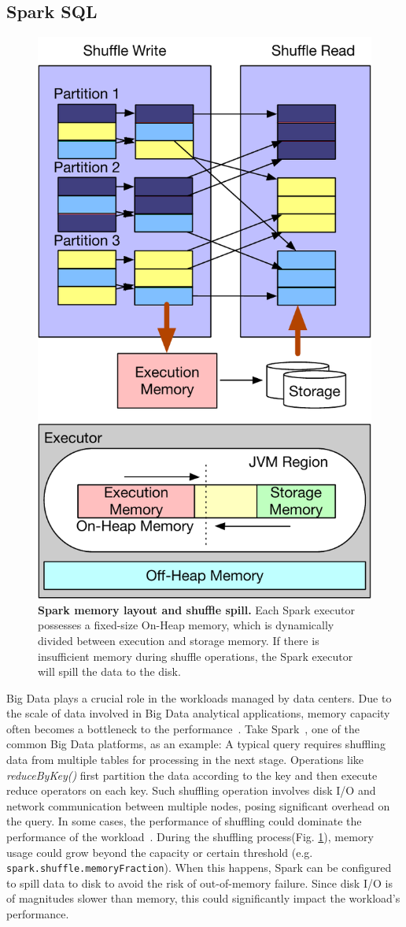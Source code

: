 \subsection{Spark SQL}
\begin{figure}[t]
\centering
 \includegraphics[width=0.5\columnwidth]{fig/cxl/spark.pdf}
  \caption[Spark memory layout and shuffle spill]{\textbf{Spark memory layout and shuffle spill.} Each Spark executor possesses a fixed-size On-Heap memory, which is dynamically divided between execution and storage memory. If there is insufficient memory during shuffle operations, the Spark executor will spill the data to the disk.}
\label{fig:eval_spark_0}
\end{figure}
Big Data plays a crucial role in the workloads managed by data centers. Due to the scale of data involved in Big Data analytical applications, memory capacity often becomes a bottleneck to the performance~\cite{sparkmemory}. Take Spark~\cite{spark}, one of the common Big Data platforms, as an example: A typical query requires shuffling data from multiple tables for processing in the next stage. Operations like \textit{reduceByKey()} first partition the data according to the key and then execute reduce operators on each key. Such shuffling operation involves disk I/O and network communication between multiple nodes, posing significant overhead on the query. In some cases, the performance of shuffling could dominate the performance of the workload~\cite{PSACS}. During the shuffling process(Fig. \ref{fig:eval_spark_0}), memory usage could grow beyond the capacity or certain threshold (e.g. \texttt{spark.shuffle.memoryFraction}). When this happens, Spark can be configured to spill data to disk to avoid the risk of out-of-memory failure. Since disk I/O is of magnitudes slower than memory, this could significantly impact the workload's performance.

